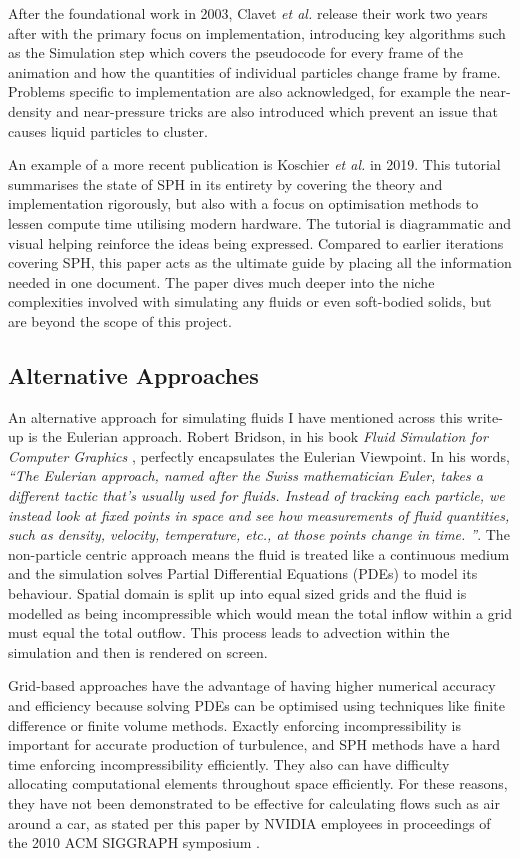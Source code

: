 \documentclass[write-up.tex]{subfiles}
\begin{document}
After the foundational work in 2003, Clavet \textit{et al.} \cite{clavet} release their work two years after with the primary focus on implementation, introducing key algorithms such as the Simulation step which covers the pseudocode for every frame of the animation and how the quantities of individual particles change frame by frame. Problems specific to implementation are also acknowledged, for example the near-density and near-pressure tricks are also introduced which prevent an issue that causes liquid particles to cluster.

An example of a more recent publication is Koschier \textit{et al.} \cite{koschier} in 2019. This tutorial summarises the state of SPH in its entirety by covering the theory and implementation rigorously, but also with a focus on optimisation methods to lessen compute time utilising modern hardware. The tutorial is diagrammatic and visual helping reinforce the ideas being expressed. Compared to earlier iterations covering SPH, this paper acts as the ultimate guide by placing all the information needed in one document. The paper dives much deeper into the niche complexities involved with simulating any fluids or even soft-bodied solids, but are beyond the scope of this project.

\subsection{Alternative Approaches}
An alternative approach for simulating fluids I have mentioned across this write-up is the Eulerian approach. Robert Bridson, in his book \textit{Fluid Simulation for Computer Graphics} \cite{bridson}, perfectly encapsulates the Eulerian Viewpoint. In his words, \textit{``The Eulerian approach, named after the Swiss mathematician Euler, takes a different tactic that’s usually used for fluids. Instead of tracking each particle, we instead look at fixed points in space and see how measurements of fluid quantities, such as density, velocity, temperature, etc., at those points change in time. ''}. The non-particle centric approach means the fluid is treated like a continuous medium and the simulation solves Partial Differential Equations (PDEs) to model its behaviour. Spatial domain is split up into equal sized grids and the fluid is modelled as being incompressible which would mean the total inflow within a grid must equal the total outflow. This process leads to advection within the simulation and then is rendered on screen.

Grid-based approaches have the advantage of having higher numerical accuracy and efficiency because solving PDEs can be optimised using techniques like finite difference or finite volume methods. Exactly enforcing incompressibility is important for accurate production of turbulence, and SPH methods have a hard time enforcing incompressibility efficiently. They also can have difficulty allocating computational elements throughout space efficiently. For these reasons, they have not been demonstrated to be effective for calculating flows such as air around a car, as stated per this paper by NVIDIA employees in proceedings of the 2010 ACM SIGGRAPH symposium \cite{cohen}.
\end{document}
